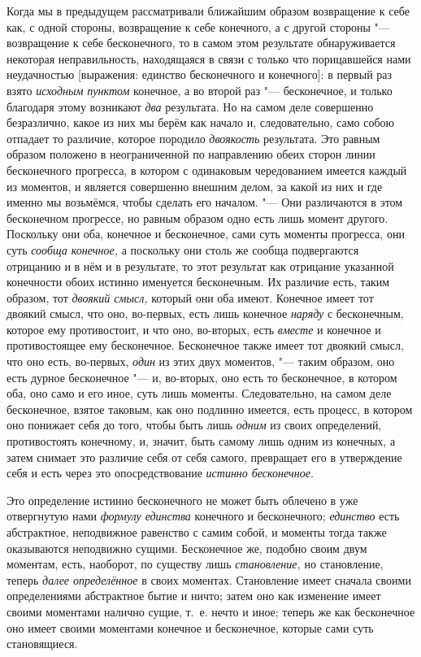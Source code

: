 Когда мы в предыдущем рассматривали ближайшим образом возвращение к себе
как, с одной стороны, возвращение к себе конечного, а с другой стороны
"--- возвращение к себе бесконечного, то в самом этом результате
обнаруживается некоторая неправильность, находящаяся в связи с только что
порицавшейся нами неудачностью [выражения: единство бесконечного и
конечного]: в первый раз взято {\em исходным пунктом}
конечное, а во второй раз "--- бесконечное, и только благодаря этому возникают
{\em два} результата. Но на самом деле совершенно
безразлично, какое из них мы берём как начало и, следовательно, само собою
отпадает то различие, которое породило {\em двоякость}
результата. Это равным образом положено в неограниченной по направлению
обеих сторон линии бесконечного прогресса, в котором с одинаковым
чередованием имеется каждый из моментов, и является совершенно внешним
делом, за какой из них и где именно мы возьмёмся, чтобы сделать его
началом. "--- Они различаются в этом бесконечном прогрессе, но равным образом
одно есть лишь момент другого. Поскольку они оба, конечное и бесконечное,
сами суть моменты прогресса, они суть {\em сообща
конечное,} а поскольку они столь же сообща подвергаются отрицанию и в нём и
в результате, то этот результат как отрицание указанной конечности обоих
истинно именуется бесконечным. Их различие есть, таким образом, тот
{\em двоякий смысл,} который они оба имеют. Конечное
имеет тот двоякий смысл, что оно, во-первых, есть лишь конечное
{\em наряду} с бесконечным, которое ему противостоит, и
что оно, во-вторых, есть {\em вместе} и конечное и
противостоящее ему бесконечное. Бесконечное также имеет тот двоякий смысл,
что оно есть, во-первых, {\em один} из этих двух
моментов, "--- таким образом, оно есть дурное бесконечное "--- и, во-вторых, оно
есть то бесконечное, в котором оба, оно само и его иное, суть лишь
моменты. Следовательно, на самом деле бесконечное, взятое таковым, как оно
подлинно имеется, есть процесс, в котором оно понижает себя до того, чтобы
быть лишь {\em одним} из своих определений,
противостоять конечному, и, значит, быть самому лишь одним из конечных, а
затем снимает это различие себя от себя самого, превращает его в
утверждение себя и есть через это опосредствование
{\em истинно бесконечное}.

Это определение истинно бесконечного не может быть облечено в уже
отвергнутую нами {\em формулу единства} конечного и
бесконечного; {\em единство} есть абстрактное,
неподвижное равенство с самим собой, и моменты тогда также оказываются неподвижно
сущими. Бесконечное же, подобно своим двум моментам, есть, наоборот, по
существу лишь {\em становление,} но становление, теперь
{\em далее определённое} в своих моментах. Становление
имеет сначала своими определениями абстрактное бытие и ничто; затем оно как
изменение имеет своими моментами налично сущие, т.~е. нечто и иное;
теперь же как бесконечное оно имеет своими моментами конечное и
бесконечное, которые сами суть становящиеся.

